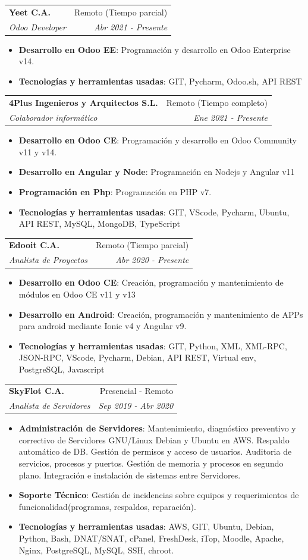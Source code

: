 \documentclass[a4paper,20pt]{article}
\makeatletter
\newcommand{\resumeItem}[2]{
  \item\small{
    \textbf{#1}{: #2 \vspace{-2pt}}
  }
}
\newcommand{\resumeSubheading}[4]{
  \vspace{-1pt}\item
    \begin{tabular*}{0.97\textwidth}{l@{\extracolsep{\fill}}r}
      \textbf{#1} & #2 \\
      \textit{#3} & \textit{#4} \\
    \end{tabular*}\vspace{-5pt}
}
\newcommand{\resumeItemListStart}{\begin{itemize}}
\newcommand{\resumeItemListEnd}{\end{itemize}\vspace{-5pt}}
\makeatother
\begin{document}
    \resumeSubheading{Yeet C.A.}{Remoto (Tiempo parcial)}
    {Odoo Developer}{Abr 2021 - Presente}
    \resumeItemListStart
        \resumeItem{Desarrollo en Odoo EE}
          {Programación y desarrollo en Odoo Enterprise v14.}
        \resumeItem{Tecnologías y herramientas usadas}{GIT, Pycharm, Odoo.sh, API REST}
      \resumeItemListEnd
      
      \vspace{10pt}   
      
    \resumeSubheading{4Plus Ingenieros y Arquitectos S.L.}{Remoto (Tiempo completo)}
    {Colaborador informático}{Ene 2021 - Presente}
    \resumeItemListStart
    
     	\resumeItem{Desarrollo en Odoo CE}
          {Programación y desarrollo en Odoo Community v11 y v14.}
        \resumeItem{Desarrollo en Angular y Node}
          {Programación en Nodejs y Angular v11}
         \resumeItem{Programación en Php}
          {Programación en PHP v7.}
          \resumeItem{Tecnologías y herramientas usadas}{GIT, VScode, Pycharm, Ubuntu, API REST, MySQL, MongoDB, TypeScript}
      \resumeItemListEnd
\vspace{10pt}   
  
  
    \resumeSubheading{Edooit C.A.}{Remoto (Tiempo parcial)}
    {Analista de Proyectos}{Abr 2020 - Presente}
    \resumeItemListStart
        \resumeItem{Desarrollo en Odoo CE}
          {Creación, programación y mantenimiento de módulos en Odoo CE v11 y v13}
          \resumeItem{Desarrollo en Android}
          {Creación, programación y mantenimiento de APPs para android mediante Ionic v4 y Angular v9.}
          \resumeItem{Tecnologías y herramientas usadas}{GIT, Python, XML, XML-RPC, JSON-RPC, VScode, Pycharm, Debian, API REST, Virtual env, PostgreSQL, Javascript}
      \resumeItemListEnd
\vspace{10pt}
    \resumeSubheading
		{SkyFlot C.A.}{Presencial - Remoto}
		{Analista de Servidores}{Sep 2019 -  Abr 2020}
		\resumeItemListStart
        \resumeItem{Administración de Servidores}
          {Mantenimiento, diagnóstico preventivo y correctivo de Servidores GNU/Linux Debian y Ubuntu en AWS. Respaldo automático de DB. Gestión de permisos y acceso de usuarios. Auditoria de servicios, procesos y puertos. Gestión de memoria y procesos en segundo plano. Integración e instalación de sistemas entre Servidores.}
        \resumeItem{Soporte Técnico}
           {Gestión de incidencias sobre equipos y requerimientos de funcionalidad(programas, respaldos, reparación).}
        \resumeItem{Tecnologías y herramientas usadas}{AWS, GIT, Ubuntu, Debian, Python, Bash, DNAT/SNAT, cPanel, FreshDesk, iTop, Moodle, Apache, Nginx, PostgreSQL, MySQL, SSH, chroot.}
		\resumeItemListEnd
		
\end{document}
